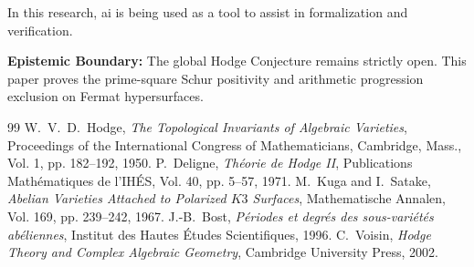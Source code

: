 \documentclass[11pt,a4paper]{article}
\theoremstyle{definition}
\begin{document}
In this research, ai is being used as a tool to assist in formalization and verification.

\textbf{Epistemic Boundary:} The global Hodge Conjecture remains strictly open. This paper proves the prime-square Schur positivity and arithmetic progression exclusion on Fermat hypersurfaces.


\begin{thebibliography}{99}
 W.~V.~D.~Hodge, \emph{The Topological Invariants of Algebraic Varieties}, Proceedings of the International Congress of Mathematicians, Cambridge, Mass., Vol. 1, pp. 182--192, 1950.
 P.~Deligne, \emph{Th\'eorie de Hodge II}, Publications Math\'ematiques de l'IH\'ES, Vol. 40, pp. 5--57, 1971.
 M.~Kuga and I.~Satake, \emph{Abelian Varieties Attached to Polarized $K3$ Surfaces}, Mathematische Annalen, Vol. 169, pp. 239--242, 1967.
 J.-B.~Bost, \emph{P\'eriodes et degr\'es des sous-vari\'et\'es ab\'eliennes}, Institut des Hautes \'Etudes Scientifiques, 1996.
 C.~Voisin, \emph{Hodge Theory and Complex Algebraic Geometry}, Cambridge University Press, 2002.
\end{thebibliography}
\end{document}
